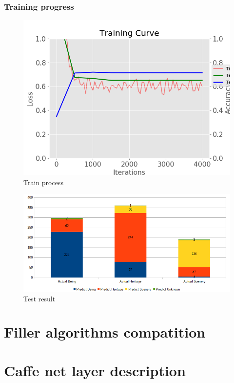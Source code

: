 \documentclass[11pt]{article}
\begin{document}
\subsubsection{Training progress}

\begin{figure}[H]
\centering
\includegraphics[width=1\textwidth]{images/train_large_dataset_pooling_5x5_stride_3}
\caption{Train process}
\end{figure}

\begin{figure}[H]
\centering
\includegraphics[width=1\textwidth]{images/result_large_dataset_pooling_5x5_stride_3}
\caption{Test result}
\end{figure}

\section{Filler algorithms compatition}

\section{Caffe net layer description}
\end{document}
